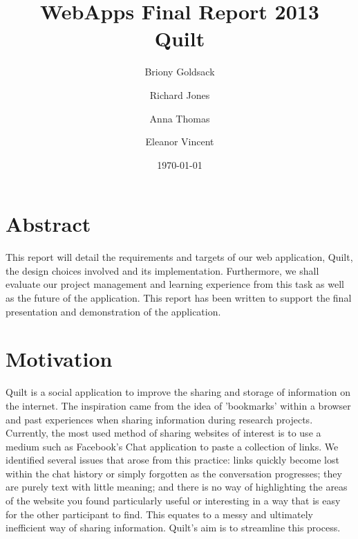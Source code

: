 \documentclass[a4wide, 10pt]{article}
\begin{document}
\title{WebApps Final Report 2013 \\
       Quilt}
\author{Briony Goldsack \and Richard Jones \and Anna Thomas \and Eleanor Vincent}
\date{\today}         
\maketitle            

\section{Abstract}

This report will detail the requirements and targets of our web application, Quilt, the design choices involved and its implementation. Furthermore, we shall evaluate our project management and learning experience from this task as well as the future of the application. This report has been written to support the final presentation and demonstration of the application.

\section{Motivation}
Quilt is a social application to improve the sharing and storage of information on the internet. The inspiration came from the idea of 'bookmarks' within a browser and past experiences when sharing information during research projects. Currently, the most used method of sharing websites of interest is to use a medium such as Facebook's Chat application to paste a collection of links. We identified several issues that arose from this practice: links quickly become lost within the chat history or simply forgotten as the conversation progresses; they are purely text with little meaning; and there is no way of highlighting the areas of the website you found particularly useful or interesting in a way that is easy for the other participant to find. This equates to a messy and ultimately inefficient way of sharing information. Quilt's aim is to streamline this process.
\end{document}
